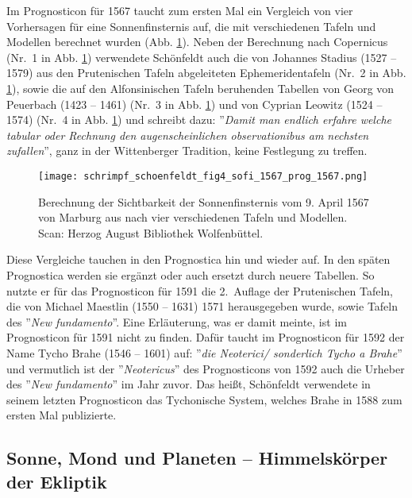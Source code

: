 \documentclass[12pt]{article}
\begin{document}
Im Prognosticon für 1567 taucht zum ersten Mal ein Vergleich von vier Vorhersagen für eine Sonnenfinsternis auf, die mit verschiedenen Tafeln und Modellen berechnet wurden (Abb. \ref{fig_sofi_1567}). Neben der Berechnung nach Copernicus (Nr.\ 1 in Abb. \ref{fig_sofi_1567}) verwendete Schönfeldt auch die von Johannes Stadius (1527 -- 1579) aus den Prutenischen Tafeln abgeleiteten Ephemeridentafeln (Nr.\ 2 in Abb. \ref{fig_sofi_1567}), sowie die auf den Alfonsinischen Tafeln beruhenden Tabellen von Georg von Peuerbach (1423 -- 1461) (Nr.\ 3 in Abb. \ref{fig_sofi_1567}) und von Cyprian Leowitz (1524 -- 1574)  (Nr.\ 4 in Abb. \ref{fig_sofi_1567}) und schreibt dazu: ''\emph{Damit man endlich erfahre welche tabular oder Rechnung den augenscheinlichen observationibus am nechsten zufallen}'', ganz in der Wittenberger Tradition, keine Festlegung zu treffen.

\begin{figure}[H]
	\begin{center}
		\texttt{[image: schrimpf\_schoenfeldt\_fig4\_sofi\_1567\_prog\_1567.png]}
		\caption{Berechnung der Sichtbarkeit der Sonnenfinsternis vom 9. April 1567 von Marburg aus \cite{Schoenfeldt1567} nach vier verschiedenen Tafeln und Modellen. Scan: Herzog August Bibliothek Wolfenbüttel.}
		\label{fig_sofi_1567}
	\end{center}
\end{figure}

Diese Vergleiche tauchen in den Prognostica hin und wieder auf. In den späten Prognostica werden sie ergänzt oder auch ersetzt durch neuere Tabellen. So nutzte er für das Prognosticon für 1591 die 2.\ Auflage der Prutenischen Tafeln, die von Michael Maestlin (1550 -- 1631) 1571 herausgegeben wurde, sowie Tafeln des ''\emph{New fundamento}''. Eine Erläuterung, was er damit meinte, ist im Prognosticon für 1591 nicht zu finden. Dafür taucht im Prognosticon für 1592 der Name Tycho Brahe (1546 -- 1601) auf: ''\emph{die Neoterici/ sonderlich Tycho a Brahe}'' und vermutlich ist der ''\emph{Neotericus}'' des Prognosticons von 1592 auch die Urheber des ''\emph{New fundamento}'' im Jahr zuvor.  Das heißt, Schönfeldt verwendete in seinem letzten Prognosticon das Tychonische System, welches Brahe in 1588 zum ersten Mal publizierte.


\subsection{Sonne, Mond und Planeten -- Himmelskörper der Ekliptik}
\end{document}
